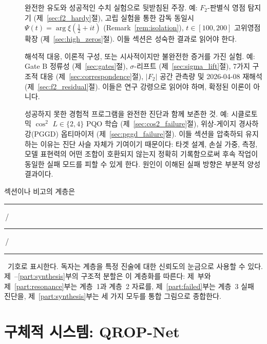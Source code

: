 \documentclass[11pt, a4paper]{article}
\theoremstyle{definition}
\theoremstyle{plain}
\newcommand{\xif}{\xi}
\newcommand{\Psip}{\Psi}
\begin{document}
\begin{description}
  \item[\textbf{\rule{0.9ex}{0.9ex}\ \ 계층 1 --- 검증됨.}]
        완전한 유도와 성공적인 수치 실험으로 뒷받침된 주장. 예:
        $F_2$-판별식 영점 탐지기 (제~\ref{sec:f2_hardy}절),
        고립 실험을 통한 감독 동일시
        $\Psip(t)=\arg\xif(\tfrac{1}{2}+it)$ (Remark~\ref{rem:isolation}),
        $t\in[100,200]$ 고위영점 확장 (제~\ref{sec:high_zeros}절).
        이들 섹션은 성숙한 결과로 읽어야 한다.

  \item[\textbf{\textcolor{orange}{\rule{0.9ex}{0.9ex}}\ \ 계층 2 --- 아이디어와 부분 결과.}]
        해석적 대응, 이론적 구성, 또는 시사적이지만 불완전한 증거를 가진 실험. 예: Gate B 정류성 (제~\ref{sec:gates}절),
        $\sigma$-리프트 (제~\ref{sec:sigma_lift}절), 7가지 구조적 대응 (제~\ref{sec:correspondence}절), $|F_2|$ 공간 관측량 및 2026-04-08 재해석 (제~\ref{sec:f2_residual}절). 이들은 연구 강령으로 읽어야 하며, 확정된 이론이 아니다.

  \item[\textbf{\textcolor{red}{\rule{0.9ex}{0.9ex}}\ \ 계층 3 --- 실패한 시도와 그 진단.}]
        성공하지 못한 경험적 프로그램을 완전한 진단과 함께 보존한 것. 예: 시클로토믹 $\cos^2$ $L\in\{2,4\}$ PQO 학습 (제~\ref{sec:cos2_failure}절), 위상-게이지 경사하강(PGGD) 옵티마이저 (제~\ref{sec:pggd_failure}절). 이들 섹션을 압축하되 유지하는 이유는 진단 사슬 자체가 기여이기 때문이다: 타겟 설계, 손실 가중, 측정, 모델 표현력의 어떤 조합이 호환되지 않는지 정확히 기록함으로써 후속 작업이 동일한 실패 모드를 피할 수 있게 한다. 원인이 이해된 실패 방향은 부분적 양성 결과이다.
\end{description}

\noindent 섹션이나 비고의 계층은 \rule{0.9ex}{0.9ex}\,/\textcolor{orange}{\rule{0.9ex}{0.9ex}}\,/\textcolor{red}{\rule{0.9ex}{0.9ex}}\ 기호로 표시한다. 독자는 계층을 특정 진술에 대한 신뢰도의 눈금으로 사용할 수 있다. 제~\ref{part:qropnet}--\ref{part:synthesis}부의 구조적 분할은 이 계층화를 따른다: 제~\ref{part:qropnet}부와 제~\ref{part:resonance}부는 계층~1과 계층~2 자료를, 제~\ref{part:failed}부는 계층~3 실패 진단을, 제~\ref{part:synthesis}부는 세 가지 모두를 통합 그림으로 종합한다.



\part{구체적 시스템: QROP-Net}
\label{part:qropnet}
\end{document}
